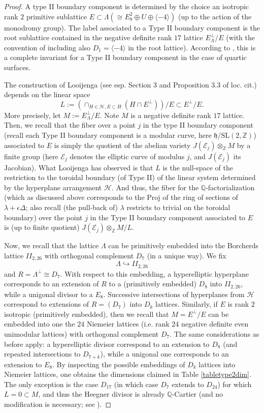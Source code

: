 \documentclass[11pt]{amsart}
\numberwithin{equation}{section}
\theoremstyle{plain}
\theoremstyle{remark}
\theoremstyle{definition}
\newcommand{\bQ}{\mathbb{Q}}
\newcommand{\bZ}{\mathbb{Z}}
\newcommand{\sH}{\mathscr{H}}
\newcommand{\SL}{\mathrm{SL}}
\newcommand{\Proj}{\mathrm{Proj}}
\begin{document}
\begin{proof} A type II boundary component is determined by the choice an isotropic rank $2$ primitive sublattice $E\subset \Lambda(\cong E_8^2\oplus U\oplus \langle -4\rangle)$ (up to the action of the monodromy group). The label associated to a Type II boundary component is the root sublattice contained in the negative definite rank $17$ lattice $E^{\perp}_{\Lambda}/E$ (with the convention of including also $D_1=\langle -4\rangle$ in the root lattice). According to \cite{scattone}, this is a complete invariant for a Type II boundary component in the case of quartic surfaces. 

The construction of Looijenga \cite{looijengacompact} (see esp. Section 3 and  Proposition 3.3 of loc. cit.) depends on the linear space
$$L:=\left(\cap_{H\in \sH, E\subset H} (H\cap E^\perp)\right)/E\subset E^\perp/E.$$
More precisely, let $M:=E_\Lambda^\perp/E$. Note $M$ is a negative definite rank $17$ lattice. Then, we recall that the fiber over a point $j$ in the type II boundary component (recall each Type II boundary component is a modular curve, here $\mathfrak{h}/\SL(2,\bZ)$) associated to $E$ is simply the quotient of the abelian variety $J(\mathcal E_j)\otimes_\bZ M$ by a finite group (here $\mathcal E_j$ denotes the elliptic curve of modulus $j$, and $J(\mathcal E_j)$ its Jacobian). What Looijenga has observed is that $L$ is the null-space of the restriction to the toroidal boundary (of Type II) of the linear system determined by the hyperplane arrangement $\sH$. And thus, the fiber for the $\bQ$-factorialization (which as discussed above corresponds to the $\Proj$ of the ring of sections of $\lambda+\epsilon \Delta$; also recall (the pull-back of) $\lambda$ restricts to trivial on the toroidal boundary) over the point $j$ in the Type II boundary component associated to $E$ is (up to finite quotient) $J(\mathcal E_j)\otimes_\bZ M/L$. 

Now, we recall that the lattice $\Lambda$ can be primitively embedded into the Borcherds lattice $II_{2,26}$ with orthogonal complement $D_7$ (in a unique way). We fix 
$$\Lambda\hookrightarrow II_{2,26}$$
and $R=\Lambda^{\perp}\cong D_7$. With respect to this embedding,  a hyperelliptic hyperplane corresponds to an extension of $R$ to a (primitively embedded) $D_8$ into $II_{2,26}$, while a unigonal divisor to a $E_8$. Successive intersections of hyperplanes from $\sH$ correspond to extensions of $R=(D_7)$ into $D_k$ lattices. Similarly, if $E$ is rank $2$ isotropic (primitively embedded), then we recall that $M=E^\perp/E$ can be embedded into one the $24$ Niemeier lattices (i.e. rank $24$ negative definite even unimodular lattices) with orthogonal complement $D_7$. The same considerations as before apply: a hyperelliptic divisor correspond to an extension to $D_8$ (and repeated intersections to $D_{7+k}$), while a unigonal one corresponds to an extension to $E_8$.  By inspecting the possible embeddings of $D_k$ lattices into Niemeier lattices, one obtains the dimensions claimed in Table \ref{tabletype2dim}. The only exception is the case $D_{17}$ (in which case $D_7$ extends to $D_{24}$) for which $L=0\subset M$, and thus the Heegner divisor is already $\bQ$-Cartier (and no modification is necessary; see \cite[Cor. 3.5]{looijengacompact}). 
\end{proof}
%
\end{document}

